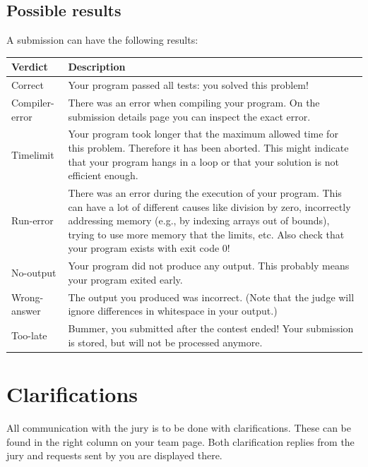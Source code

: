 \subsection{Possible results}
A submission can have the following results:

\begin{center}
\begin{longtable}{|l|p{12.5cm}|}
\hline
\textbf{Verdict} &
\textbf{Description}\\\hline
Correct &
Your program passed all tests: you solved this problem!\\\hline
Compiler-error &
There was an error when compiling your program. On the submission
details page you can inspect the exact error.
\\\hline
Timelimit &
Your program took longer that the maximum allowed time for this
problem. Therefore it has been aborted. This might indicate that
your program hangs in a loop or that your solution is not
efficient enough.\\\hline
Run-error &
There was an error during the execution of your program. This
can have a lot of different causes like division by zero,
incorrectly addressing memory (e.g., by indexing arrays out of
bounds), trying to use more memory that the limits, etc.
Also check that your program exists with exit code 0!\\\hline
No-output&
Your program did not produce any output. This probably means your
program exited early.\\\hline
Wrong-answer&
The output you produced was incorrect. (Note that the judge will
ignore differences in whitespace in your output.)
\\\hline
Too-late&
Bummer, you submitted after the contest ended! Your submission
is stored, but will not be processed anymore.\\\hline
\end{longtable}
\end{center}

\bigskip

\section{Clarifications}
All communication with the jury is to be done with clarifications. These
can be found in the right column on your team page.
Both clarification replies from the jury and requests sent by you are
displayed there.

